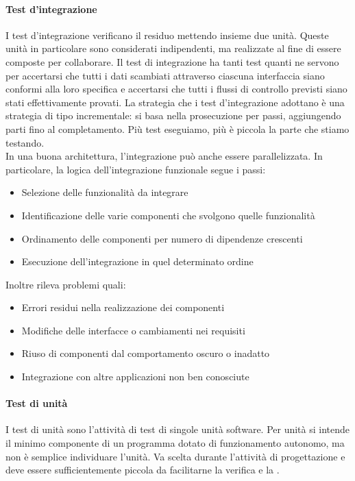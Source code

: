 			\paragraph{Test d'integrazione} \label{testintegrazione}
			I test d'integrazione verificano il residuo mettendo insieme due unità. Queste unità in particolare sono considerati indipendenti, ma realizzate al fine di essere composte per collaborare.
			Il test di integrazione ha tanti test quanti ne servono per accertarsi che tutti i dati scambiati attraverso ciascuna interfaccia siano conformi alla loro specifica e accertarsi che tutti i flussi di controllo previsti siano stati effettivamente provati.
			La strategia che i test d'integrazione adottano è una strategia di tipo incrementale: si basa nella prosecuzione per passi, aggiungendo parti fino al completamento. 
			Più test eseguiamo, più è piccola la parte che stiamo testando. \\
			In una buona architettura, l'integrazione può anche essere parallelizzata.
			In particolare, la logica dell'integrazione funzionale segue i passi:
			\begin{itemize}
				\item Selezione delle funzionalità da integrare
				\item Identificazione delle varie componenti che svolgono quelle funzionalità
				\item Ordinamento delle componenti per numero di dipendenze crescenti
				\item Esecuzione dell'integrazione in quel determinato ordine
			\end{itemize}
			Inoltre rileva problemi quali:
			\begin{itemize}
				\item Errori residui nella realizzazione dei componenti
				\item Modifiche delle interfacce o cambiamenti nei requisiti
				\item Riuso di componenti dal comportamento oscuro o inadatto
				\item Integrazione con altre applicazioni non ben conosciute
			\end{itemize}
			
			
			\paragraph{Test di unità} \label{testunita} 
			I test di unità sono l'attività di test di singole unità software.
			Per unità si intende il minimo componente di un programma dotato di funzionamento autonomo, ma non è semplice individuare l'unità.
			Va scelta durante l'attività di progettazione e deve essere sufficientemente piccola da facilitarne la verifica e la . 
			
